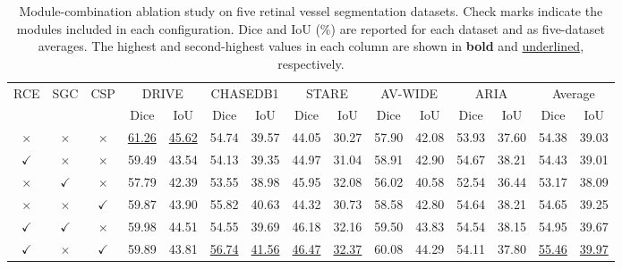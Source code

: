 \documentclass[a4paper,fleqn]{cas-sc}
\renewcommand{\arraystretch}{1.08}
\begin{document}
\begin{table}[pos=!htbp]
\centering
\caption{Module-combination ablation study on five retinal vessel segmentation datasets. Check marks indicate the modules included in each configuration. Dice and IoU (\%) are reported for each dataset and as five-dataset averages. The highest and second-highest values in each column are shown in \textbf{bold} and \underline{underlined}, respectively.}
\label{tab:ablation_all}
\scriptsize
\setlength{\tabcolsep}{4pt}
\renewcommand{\arraystretch}{1.08}

\begin{adjustbox}{max width=\textwidth,center}
\begin{tabular}{ccccccccccccccc}
\toprule
\multirow{2}{*}{RCE} &
\multirow{2}{*}{SGC} &
\multirow{2}{*}{CSP}
& \multicolumn{2}{c}{DRIVE}
& \multicolumn{2}{c}{CHASEDB1}
& \multicolumn{2}{c}{STARE}
& \multicolumn{2}{c}{AV-WIDE}
& \multicolumn{2}{c}{ARIA}
& \multicolumn{2}{c}{Average} \\
\cmidrule(lr){4-5}
\cmidrule(lr){6-7}
\cmidrule(lr){8-9}
\cmidrule(lr){10-11}
\cmidrule(lr){12-13}
\cmidrule(lr){14-15}
& & & Dice & IoU & Dice & IoU & Dice & IoU & Dice & IoU & Dice & IoU & Dice & IoU \\
\midrule
$\times$ & $\times$ & $\times$
& \underline{61.26} & \underline{45.62}
& 54.74 & 39.57
& 44.05 & 30.27
& 57.90 & 42.08
& 53.93 & 37.60
& 54.38 & 39.03 \\

$\checkmark$ & $\times$ & $\times$
& 59.49 & 43.54
& 54.13 & 39.35
& 44.97 & 31.04
& 58.91 & 42.90
& 54.67 & 38.21
& 54.43 & 39.01 \\

$\times$ & $\checkmark$ & $\times$
& 57.79 & 42.39
& 53.55 & 38.98
& 45.95 & 32.08
& 56.02 & 40.58
& 52.54 & 36.44
& 53.17 & 38.09 \\

$\times$ & $\times$ & $\checkmark$
& 59.87 & 43.90
& 55.82 & 40.63
& 44.32 & 30.73
& 58.58 & 42.80
& 54.64 & 38.21
& 54.65 & 39.25 \\

$\checkmark$ & $\checkmark$ & $\times$
& 59.98 & 44.51
& 54.55 & 39.69
& 46.18 & 32.16
& 59.50 & 43.83
& 54.54 & 38.15
& 54.95 & 39.67 \\

$\checkmark$ & $\times$ & $\checkmark$
& 59.89 & 43.81
& \underline{56.74} & \underline{41.56}
& \underline{46.47} & \underline{32.37}
& 60.08 & 44.29
& 54.11 & 37.80
& \underline{55.46} & \underline{39.97} \\


\end{tabular}
\end{adjustbox}
\end{table}
\end{document}
